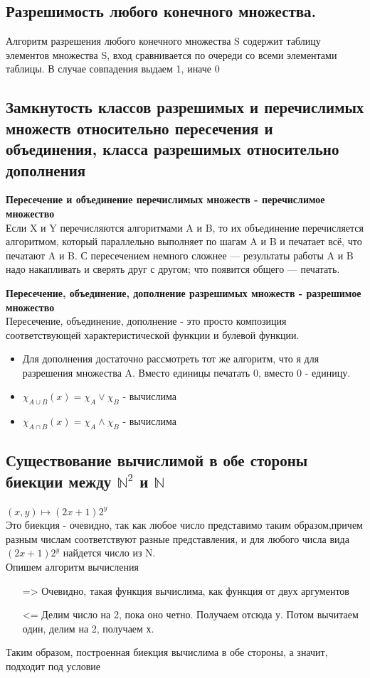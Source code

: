 \subsection{Разрешимость любого конечного множества.}
Алгоритм разрешения любого конечного множества S содержит таблицу элементов множества S, вход сравнивается по очереди со всеми элементами таблицы. В случае совпадения выдаем 1, иначе 0

\subsection{Замкнутость классов разрешимых и перечислимых множеств относительно пересечения и объединения, класса разрешимых относительно дополнения}
\textbf{Пересечение и объединение перечислимых множеств - перечислимое множество}
\\
Если X и Y перечисляются алгоритмами A и B, то их объединение перечисляется алгоритмом, который параллельно выполняет по шагам A и B и печатает всё, что печатают A и B. С пересечением немного сложнее — результаты работы A и B надо накапливать и сверять друг с другом; что появится общего — печатать.

\textbf{Пересечение, объединение, дополнение разрешимых множеств - разрешимое множество}\\
Пересечение, объединение, дополнение - это просто композиция соответствующей характеристической функции и булевой функции.
\begin{itemize}
    \item Для дополнения достаточно рассмотреть тот же алгоритм, что я для разрешения множества A. Вместо единицы печатать 0, вместо 0 - единицу.
    \item $\chi_{A \cup B}(x) = \chi_A \vee \chi_B$ - вычислима
    \item $\chi_{A \cap B}(x) = \chi_A \wedge \chi_B$ - вычислима
\end{itemize}

\subsection{Существование вычислимой в обе стороны биекции между $\mathbb{N}^2$ и $\mathbb{N}$}
$(x,y) \mapsto (2x + 1)2^y$
\\
Это биекция - очевидно, так как любое число представимо таким образом,причем разным числам соответствуют разные представления, и для любого числа вида $(2x + 1)2^y$ найдется число из N. 
\\
Опишем алгоритм вычисления
\begin{itemize}
    \item [=>] Очевидно, такая функция вычислима, как функция от двух аргументов
    \item[<=] Делим число на 2, пока оно четно. Получаем отсюда у. Потом вычитаем один, делим на 2, получаем х. 
\end{itemize}
Таким образом, построенная биекция вычислима в обе стороны, а значит, подходит под условие

